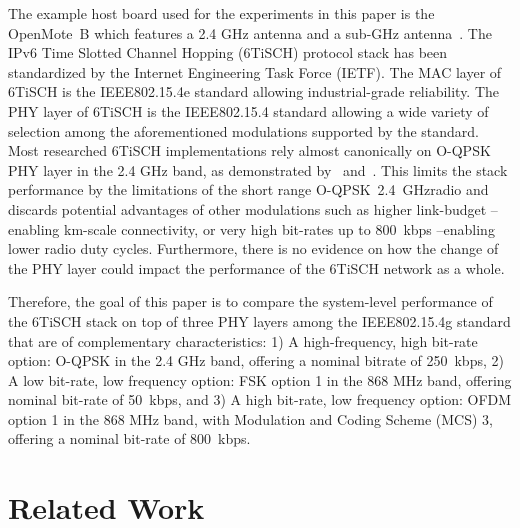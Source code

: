 \documentclass[sensors,article,submit,moreauthors,pdftex]{Definitions/mdpi}
\newcommand{\oqpsk}        {O-QPSK~2.4~GHz}
\begin{document}

The example host board used for the experiments in this paper is the OpenMote~B which features a 2.4 GHz antenna and a sub-GHz antenna~\cite{tuset16openmote}.
The IPv6 Time Slotted Channel Hopping (6TiSCH) protocol stack has been  standardized by the Internet Engineering Task Force (IETF).
The MAC layer of 6TiSCH is the IEEE802.15.4e standard allowing industrial-grade reliability.
The PHY layer of 6TiSCH is the IEEE802.15.4 standard allowing a wide variety of selection among the aforementioned modulations supported by the standard.
Most researched 6TiSCH implementations rely almost canonically on O-QPSK PHY layer in the 2.4 GHz band, as demonstrated by~\cite{draft-munoz-6tisch-multi-phy-nodes} and~\cite{brachmann19ieee}.
This limits the stack performance by the limitations of the short range \oqpsk radio and discards potential advantages of other modulations such as higher link-budget --enabling km-scale connectivity, or very high bit-rates up to 800~kbps --enabling lower radio duty cycles.
Furthermore, there is no evidence on how the change of the PHY layer could impact the performance of the 6TiSCH network as a whole. 

Therefore, the goal of this paper is to compare the system-level performance of the 6TiSCH stack on top of three PHY layers among the IEEE802.15.4g standard that are of complementary characteristics: 
     1) A high-frequency, high bit-rate option: O-QPSK in the 2.4 GHz band, offering a nominal bitrate of 250~kbps,
     2) A low bit-rate, low frequency option: FSK option 1 in the 868 MHz band, offering nominal bit-rate of 50~kbps, and 
     3) A high bit-rate, low frequency option: OFDM option 1  in the 868 MHz band, with Modulation and Coding Scheme (MCS) 3, offering a nominal bit-rate of 800~kbps. 

\section{Related Work}
\label{sec:related_work}

\end{document}
